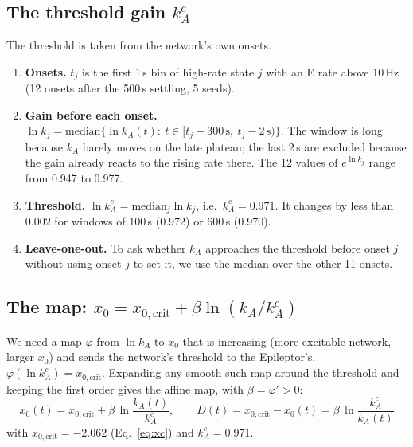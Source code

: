 \documentclass[11pt]{article}
\newcommand{\kA}{k_A}
\newcommand{\xc}{x_{0,\mathrm{crit}}}
\begin{document}
\subsection{The threshold gain $\kA^c$}\label{sec:Hc}
The threshold is taken from the network's own onsets.
\begin{enumerate}
\item \textbf{Onsets.} $t_j$ is the first 1\,s bin of high-rate state $j$ with an E rate above 10\,Hz (12 onsets after the
500\,s settling, 5 seeds).
\item \textbf{Gain before each onset.} $\ln k_j = \mathrm{median}\{\ln\kA(t):\ t\in[t_j-300\,\mathrm s,\ t_j-2\,\mathrm s)\}$.
The window is long because $\kA$ barely moves on the late plateau; the last 2\,s are excluded because the gain already
reacts to the rising rate there. The 12 values of $e^{\ln k_j}$ range from 0.947 to 0.977.
\item \textbf{Threshold.} $\ln\kA^c = \mathrm{median}_j \ln k_j$, i.e.\ $\kA^c = 0.971$. It changes by less than 0.002
for windows of 100\,s (0.972) or 600\,s (0.970).
\item \textbf{Leave-one-out.} To ask whether $\kA$ approaches the threshold before onset $j$ without using onset $j$ to set
it, we use the median over the other 11 onsets.
\end{enumerate}

\subsection{The map: $x_0 = \xc + \beta\ln(\kA/\kA^c)$}\label{sec:map}
We need a map $\varphi$ from $\ln\kA$ to $x_0$ that is increasing (more excitable network, larger $x_0$) and sends the
network's threshold to the Epileptor's, $\varphi(\ln\kA^c) = \xc$. Expanding any smooth such map around the threshold
and keeping the first order gives the affine map, with $\beta = \varphi'>0$:
\begin{equation}\boxed{\;x_0(t) = \xc + \beta\,\ln\frac{\kA(t)}{\kA^c},\qquad D(t) = \xc - x_0(t) = \beta\,\ln\frac{\kA^c}{\kA(t)}\;}
\label{eq:map}\end{equation}
with $\xc = -2.062$ (Eq.~\ref{eq:xc}) and $\kA^c = 0.971$.
\end{document}
